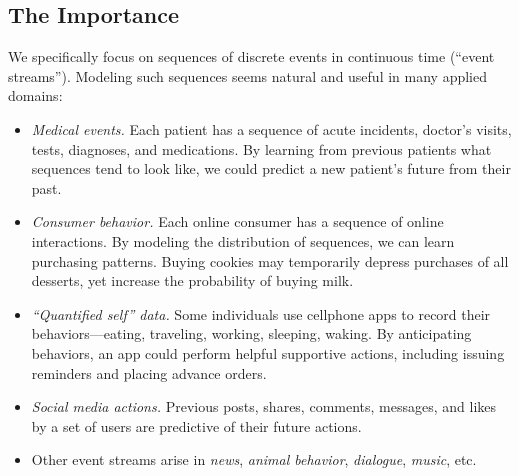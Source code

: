 \documentclass{article}
\newcommand{\note}[4][]{\todo[author=#2,color=#3,size=\scriptsize,fancyline,caption={},#1]{#4}} %
\newcommand{\jason}[2][]{\note[#1]{jason}{green!40}{#2}}
\newcommand{\cutforspace}[1]{}
\begin{document}
\subsection{The Importance}
We specifically focus on sequences of discrete events in continuous time (``event streams'').
Modeling such sequences seems natural and useful in many applied domains:
\begin{itemize}
\item {\em Medical events.}  Each patient has a sequence of acute incidents, doctor's visits, tests, diagnoses, and medications.  By learning from previous patients what sequences tend to look like, we could predict a new patient's future from their past.
\item {\em Consumer behavior.}  Each online consumer has a sequence of online interactions.  By modeling the distribution of sequences, we can learn purchasing patterns.  Buying cookies may temporarily depress purchases of all desserts, yet increase the probability of buying milk.
\item {\em ``Quantified self'' data.}  Some individuals use cellphone apps to record their behaviors---eating, traveling, working, sleeping, waking.\cutforspace{such as eating specific foods, traveling among locations, performing specific work and leisure activities, sleeping and waking.}  By anticipating behaviors, an app could perform helpful supportive actions, including issuing reminders\cutforspace{ or warnings} and placing advance orders.
\item {\em Social media actions.}  Previous posts, shares, comments, messages, and likes by a set of users are predictive of their future actions.
\item Other event streams arise in {\em news}, {\em animal behavior}, {\em dialogue}, {\em music}, etc.
\end{itemize}
\end{document}
